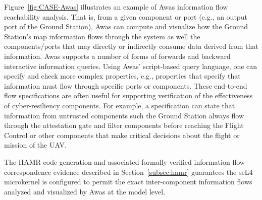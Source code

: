 Figure~\ref{fig:CASE-Awas} illustrates an example of Awas information flow reachability analysis.  That is, from a given component or port (e.g., an output port of the Ground Station), Awas can compute and visualize how the Ground Station’s map information flows through the system as well the components/ports that may directly or indirectly consume data derived from that information.  Awas supports a number of forms of forwards and backward interactive information queries.  Using Awas' script-based query language, one can specify and check more complex properties, e.g., properties that specify that information must flow through specific ports or components.   These end-to-end flow specifications are often useful for supporting verification of the effectiveness of cyber-resiliency components.   For example, a specification can state that information from untrusted components such the Ground Station always flow through the attestation gate and filter components before reaching the Flight Control or other components that make critical decisions about the flight or mission of the UAV.

The HAMR code generation and associated formally verified information
flow correspondence evidence described in Section~\ref{subsec:hamr}
guarantees the seL4 microkernel is configured to permit the exact
inter-component information flows analyzed and visualized by Awas at
the model level.